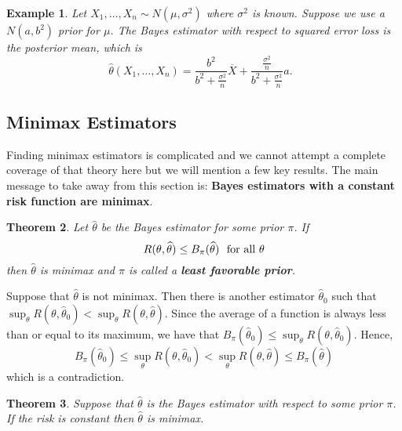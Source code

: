 \documentclass[twoside,12pt]{article}
\newcounter{lecnum}
\newtheorem{theorem}{Theorem}[lecnum]
\newtheorem{example}[theorem]{Example}
\begin{document}
\begin{example}
Let $X_1, \ldots, X_n \sim N(\mu,\sigma^2)$
where $\sigma^2$ is known.
Suppose we use a $N(a,b^2)$ prior for $\mu$.
The Bayes estimator with respect to squared error loss
is the posterior mean, which is
\begin{equation}
\widehat\theta(X_1, \ldots, X_n)=
\frac{b^2}{b^2+ \frac{\sigma^2}{n}} \overline{X} + 
\frac{\frac{\sigma^2}{n}}{b^2+ \frac{\sigma^2}{n}} a.\ \ \ 
\end{equation}
\end{example}

\subsection{Minimax Estimators}

Finding minimax estimators is complicated and we cannot
attempt a complete coverage of that theory here
but we will mention a few key results.
The main message to take away from this section is:
{\bf Bayes estimators with a constant risk function are minimax}.



\begin{theorem}\label{thm::first-minimax}
Let $\widehat\theta$ be the Bayes estimator for some prior $\pi$.
If
\begin{equation}\label{eq:cond}
R(\theta,\widehat\theta)\leq B_\pi(\widehat\theta)\ \ {\rm for\ all\ }\theta
\end{equation}
then $\widehat\theta$ is minimax and $\pi$ is called a 
{\bf least favorable prior}.
\end{theorem}

\proof
Suppose that $\widehat\theta$ is not minimax.
Then there is another estimator $\widehat{\theta}_0$ such that
$\sup_\theta R(\theta, \widehat{\theta}_0) < \sup_\theta R(\theta,\widehat\theta)$.
Since the average of a function is always less than or equal to its maximum,
we have that
$B_\pi(\widehat{\theta}_0)\leq \sup_\theta R(\theta,\widehat{\theta}_0)$.
Hence,
\begin{equation}
B_\pi(\widehat{\theta}_0)  \leq \sup_\theta R(\theta,\widehat{\theta}_0) <
\sup_\theta R(\theta,\widehat\theta) \leq
 B_\pi(\widehat\theta)
\end{equation}
which is a contradiction. 


\begin{theorem}
Suppose that $\widehat{\theta}$ is the Bayes estimator with respect to some prior $\pi$.
If the risk is constant
then $\widehat{\theta}$ is minimax.
\end{theorem}
\end{document}
